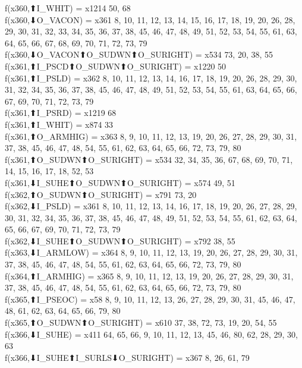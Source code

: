 f(x360,⬆I_WHIT) = x1214 {50, 68} \\
f(x360,⬇O_VACON) = x361 {8, 10, 11, 12, 13, 14, 15, 16, 17, 18, 19, 20, 26, 28, 29, 30, 31, 32, 33, 34, 35, 36, 37, 38, 45, 46, 47, 48, 49, 51, 52, 53, 54, 55, 61, 63, 64, 65, 66, 67, 68, 69, 70, 71, 72, 73, 79} \\
f(x360,⬇O_VACON⬆O_SUDWN⬆O_SURIGHT) = x534 {73, 20, 38, 55} \\
f(x361,⬆I_PSCD⬆O_SUDWN⬆O_SURIGHT) = x1220 {50} \\
f(x361,⬆I_PSLD) = x362 {8, 10, 11, 12, 13, 14, 16, 17, 18, 19, 20, 26, 28, 29, 30, 31, 32, 34, 35, 36, 37, 38, 45, 46, 47, 48, 49, 51, 52, 53, 54, 55, 61, 63, 64, 65, 66, 67, 69, 70, 71, 72, 73, 79} \\
f(x361,⬆I_PSRD) = x1219 {68} \\
f(x361,⬆I_WHIT) = x874 {33} \\
f(x361,⬆O_ARMHIG) = x363 {8, 9, 10, 11, 12, 13, 19, 20, 26, 27, 28, 29, 30, 31, 37, 38, 45, 46, 47, 48, 54, 55, 61, 62, 63, 64, 65, 66, 72, 73, 79, 80} \\
f(x361,⬆O_SUDWN⬆O_SURIGHT) = x534 {32, 34, 35, 36, 67, 68, 69, 70, 71, 14, 15, 16, 17, 18, 52, 53} \\
f(x361,⬇I_SUHE⬆O_SUDWN⬆O_SURIGHT) = x574 {49, 51} \\
f(x362,⬆O_SUDWN⬆O_SURIGHT) = x791 {73, 20} \\
f(x362,⬇I_PSLD) = x361 {8, 10, 11, 12, 13, 14, 16, 17, 18, 19, 20, 26, 27, 28, 29, 30, 31, 32, 34, 35, 36, 37, 38, 45, 46, 47, 48, 49, 51, 52, 53, 54, 55, 61, 62, 63, 64, 65, 66, 67, 69, 70, 71, 72, 73, 79} \\
f(x362,⬇I_SUHE⬆O_SUDWN⬆O_SURIGHT) = x792 {38, 55} \\
f(x363,⬇I_ARMLOW) = x364 {8, 9, 10, 11, 12, 13, 19, 20, 26, 27, 28, 29, 30, 31, 37, 38, 45, 46, 47, 48, 54, 55, 61, 62, 63, 64, 65, 66, 72, 73, 79, 80} \\
f(x364,⬆I_ARMHIG) = x365 {8, 9, 10, 11, 12, 13, 19, 20, 26, 27, 28, 29, 30, 31, 37, 38, 45, 46, 47, 48, 54, 55, 61, 62, 63, 64, 65, 66, 72, 73, 79, 80} \\
f(x365,⬆I_PSEOC) = x58 {8, 9, 10, 11, 12, 13, 26, 27, 28, 29, 30, 31, 45, 46, 47, 48, 61, 62, 63, 64, 65, 66, 79, 80} \\
f(x365,⬆O_SUDWN⬆O_SURIGHT) = x610 {37, 38, 72, 73, 19, 20, 54, 55} \\
f(x366,⬇I_SUHE) = x411 {64, 65, 66, 9, 10, 11, 12, 13, 45, 46, 80, 62, 28, 29, 30, 63} \\
f(x366,⬇I_SUHE⬆I_SURLS⬇O_SURIGHT) = x367 {8, 26, 61, 79} \\
